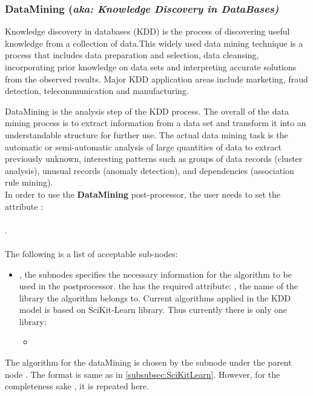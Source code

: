 \subsubsection{DataMining (\textit{aka: Knowledge Discovery in DataBases)}}
\label{subsubsec:DataMining}

Knowledge discovery in databases (KDD) is the process of discovering
 useful knowledge from a collection of data.This widely used data
mining technique is a process that includes data preparation and
selection, data cleansing, incorporating prior knowledge on data
sets and interpreting accurate solutions from the observed results.
Major KDD application areas include marketing, fraud detection,
telecommunication and manufacturing.

DataMining is the analysis step of the KDD process. The overall of
the data mining process is to extract information from a data set
and transform it into an understandable structure for further use.
The actual data mining task is the
automatic or semi-automatic analysis of large quantities of data
to extract previously unknown, interesting patterns such as groups
 of data records (cluster analysis), unusual records (anomaly
detection), and dependencies (association rule mining).
\\
%
In order to use the \textbf{DataMining} post-processor, the user
needs to set the attribute : \\
\\
. \\
\\
The following is a list of acceptable sub-nodes:
\begin{itemize}
  \item {} , the subnodes specifies
  the necessary information for the algorithm to be used in the postprocessor.
  the  has the required attribute: , the name of the
  library the algorithm belongs to. Current algorithms applied in the KDD model
  is based on SciKit-Learn library. Thus currently there is only one library:
  \begin{itemize}
    \item {}
  \end{itemize}
\end{itemize}

The algorithm for the dataMining is chosen by the subnode
 under the parent node . The format is
same as in \ref{subsubsec:SciKitLearn}. However, for the completeness sake
, it is repeated here.

